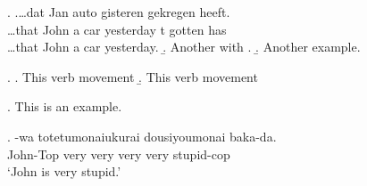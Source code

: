 \documentclass{article}
\begin{document}
\ex. 
\ag.\ldots dat Jan  auto gisteren   gekregen heeft.\\
\ldots that John a car  yesterday t gotten has \\
\ldots that John a car yesterday.
\b. Another  with .
\b. Another example.

\ex.
\a. This  verb movement 
\b. This  verb movement 

\ex. This is an example.

\exg.
-wa totetumonaiukurai dousiyoumonai     baka-da.\\
 John-Top very very very very {} stupid-cop \\
 `John is very stupid.'  
 
\end{document}
